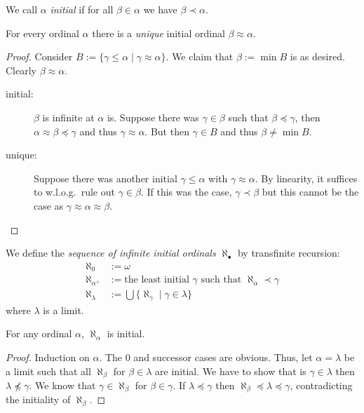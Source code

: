 \documentclass{whrartcl}
\begin{document}
\begin{definition}
  We call $\alpha$ \emph{initial} if for all $\beta \in \alpha$ we have $\beta \prec \alpha$.
\end{definition}

\begin{lemma}
  For every ordinal $\alpha$ there is a \emph{unique} initial ordinal
  $\beta \approx \alpha$.
\end{lemma}
\begin{proof}
  Consider
  \(
    B := \{\gamma \leq \alpha \mid \gamma \approx \alpha\}.
  \)
  We claim that $\beta := \min B$ is as desired. Clearly $\beta \approx \alpha$.
  \begin{description}
  \item[initial:] $\beta$ is infinite at $\alpha$ is. Suppose there was $\gamma
    \in \beta$ such that $\beta \preceq \gamma$, then $\alpha \approx \beta
    \preceq \gamma$ and thus $\gamma \approx \alpha$. But then $\gamma \in B$ and
    thus $\beta \neq \min B$.
  \item[unique:] Suppose there was another initial $\gamma \leq \alpha$ with
    $\gamma \approx \alpha$. By linearity, it suffices to w.l.o.g.\ rule out
    $\gamma \in \beta$. If this was the case, $\gamma \prec \beta$ but this
    cannot be the case as $\gamma \approx \alpha \approx \beta$.
  \end{description}
\end{proof}

\begin{definition}
  We define the \emph{sequence of infinite initial ordinals} $\aleph_\bullet$ by
  transfinite recursion:
  \begin{align*}
    \aleph_0 & := \omega \\
    \aleph_{\alpha^+} & := \text{the least initial } \gamma \text{ such that } \aleph_\alpha \prec \gamma \\
    \aleph_{\lambda} & := \bigcup \{\aleph_\gamma \mid \gamma \in \lambda\}
  \end{align*}
  where $\lambda$ is a limit.
\end{definition}

\begin{lemma}
  For any ordinal $\alpha$, $\aleph_\alpha$ is initial.
\end{lemma}
\begin{proof}
  Induction on $\alpha$. The $0$ and successor cases are obvious. Thus, let
  $\alpha = \lambda$ be a limit such that all $\aleph_\beta$ for $\beta \in
  \lambda$ are initial. We have to show that is $\gamma \in \lambda$ then
  $\lambda \not\preceq \gamma$. We know that $\gamma \in \aleph_\beta$ for $\beta
  \in \gamma$. If $\lambda \preceq \gamma$ then $\aleph_\beta \preceq \lambda
  \preceq \gamma$, contradicting the initiality of $\aleph_\beta$.
\end{proof}
\end{document}
